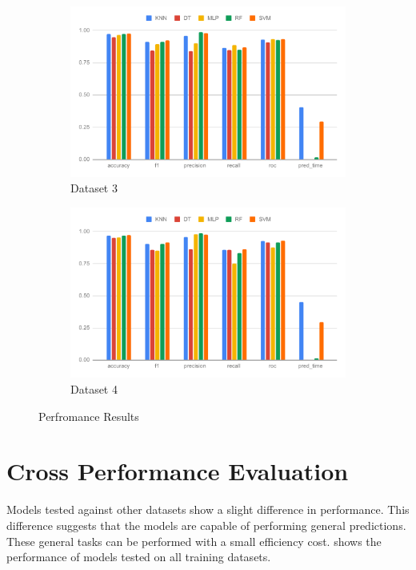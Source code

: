 \begin{figure}[H]
\begin{subfigure}{.5\columnwidth}
    \includegraphics[width=0.9\columnwidth]{media/data/performance/perf_ds_3.pdf}
    \caption{Dataset 3}
    \label{fig:perfromance_results_dataset_3}
  \end{subfigure}%
  \begin{subfigure}{.5\columnwidth}
    \centering
    \includegraphics[width=0.9\columnwidth]{media/data/performance/perf_ds_4.pdf}
    \caption{Dataset 4}
    \label{fig:perfromance_results_dataset_4}
  \end{subfigure}
  \caption{Perfromance Results}
  \label{fig:perfromance_results}
\end{figure}

\section{Cross Performance Evaluation} \label{sec:cross_performance_evaluation}

Models tested against other datasets show a slight difference in performance. This difference suggests that the models are capable of performing general predictions. These general tasks can be performed with a small efficiency cost.  shows the performance of models tested on all training datasets.

